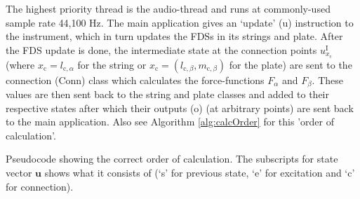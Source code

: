 \documentclass{article}
\begin{document}
The highest priority thread is the audio-thread and runs at commonly-used sample rate 44,100 Hz. The main application gives an `update' (u) instruction to the instrument, which in turn updates the FDSs in its strings and plate. After the FDS update is done, the intermediate state at the connection points $u^\text{I}_{x_\text{c}}$ (where $x_\text{c} = l_{\text{c},\alpha}$ for the string or $x_\text{c} = (l_{\text{c},\beta}, m_{\text{c},\beta})$ for the plate) are sent to the connection (Conn) class which calculates the force-functions $F_\alpha$ and $F_\beta$. These values are then sent back to the string and plate classes and added to their respective states after which their outputs (o) (at arbitrary points) are sent back to the main application. Also see Algorithm \ref{alg:calcOrder} for this 'order of calculation'.
\begin{algorithm}[h]\label{alg:calcOrder}
 \caption{Pseudocode showing the correct order of calculation. The subscripts for state vector $\mathbf{u}$ shows what it consists of (`s' for previous state, `e' for excitation and `c' for connection).}
\end{algorithm}
\end{document}
